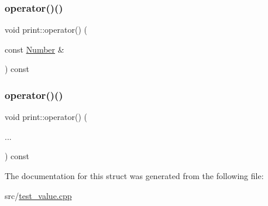 \mbox{\label{structprint_ae4c5756e35f640e4a1af7a35bae86bcf}} 
\subsubsection{\texorpdfstring{operator()()}{operator()()}\hspace{0.1cm}{\footnotesize\ttfamily [5/6]}}
{\footnotesize\ttfamily void print\+::operator() (\begin{DoxyParamCaption}\item[{const \hyperlink{struct_number}{Number} \&}]{ }\end{DoxyParamCaption}) const\hspace{0.3cm}{\ttfamily [inline]}}

\mbox{\label{structprint_a9a42d574398b55c09bf3439a5a9aa33a}} 
\subsubsection{\texorpdfstring{operator()()}{operator()()}\hspace{0.1cm}{\footnotesize\ttfamily [6/6]}}
{\footnotesize\ttfamily void print\+::operator() (\begin{DoxyParamCaption}\item[{}]{... }\end{DoxyParamCaption}) const\hspace{0.3cm}{\ttfamily [inline]}}



The documentation for this struct was generated from the following file\+:\begin{DoxyCompactItemize}
\item 
src/\hyperlink{test__value_8cpp}{test\+\_\+value.\+cpp}\end{DoxyCompactItemize}
